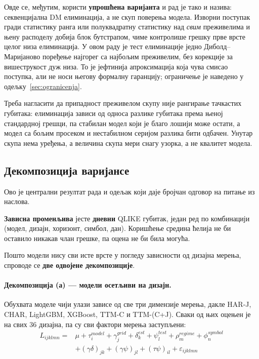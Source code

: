 Овде се, међутим, користи \textbf{упрошћена варијанта} и рад је тако и назива:
секвенцијална DM елиминација, а не скуп поверења модела. Изворни поступак гради
статистику ранга или полуквадратну статистику над \emph{свим} преживелима и њену
расподелу добија блок бутстрапом, чиме контролише грешку прве врсте целог низа
елиминација. У овом раду је тест елиминације једно Диболд–Маријаново поређење најгорег
са најбољим преживелим, без корекције за вишеструкост дуж низа. То је јефтинија
апроксимација која чува смисао поступка, али не носи његову формалну гаранцију;
ограничење је наведено у одељку~\ref{sec:ogranicenja}.

Треба нагласити да припадност преживелом скупу није рангирање тачкастих губитака:
елиминација зависи од односа разлике губитака према њеној стандардној грешци, па
стабилан модел који је благо лошији може остати, а модел са бољим просеком и
нестабилном серијом разлика бити одбачен. Унутар скупа нема уређења, а величина скупа
мери снагу узорка, а не квалитет модела.

\subsection{Декомпозиција варијансе}
\label{subsec:anova}

Ово је централни резултат рада и одељак који даје бројчан одговор на питање из наслова.

\textbf{Зависна променљива} јесте \textbf{дневни} QLIKE губитак, један ред по
комбинацији (модел, дизајн, хоризонт, симбол, дан). Коришћење средина ћелија не би
оставило никакав члан грешке, па оцена не би била могућа.

Пошто модели нису сви исте врсте у погледу зависности од дизајна мерења, спроводе се
\textbf{две одвојене декомпозиције}.

\paragraph{Декомпозиција (а) — модели осетљиви на дизајн.}
Обухвата моделе чији улази зависе од све три димензије мерења, дакле HAR-J, CHAR,
LightGBM, XGBoost, TTM-C и TTM-(C+J). Сваки од њих оцењен је на свих 36
дизајна, па су сви фактори мерења заступљени:
\begin{equation}
\begin{split}
L_{ijklmn} = {}& \mu + \tau_i^{model} + \gamma_j^{grid} + \delta_k^{est}
+ \psi_l^{test} + \rho_m^{regime} + \phi_n^{symbol} \\
& + (\gamma\delta)_{jk} + (\gamma\psi)_{jl} + (\tau\psi)_{il} + \varepsilon_{ijklmn}
\end{split}
\label{eq:anova}
\end{equation}

